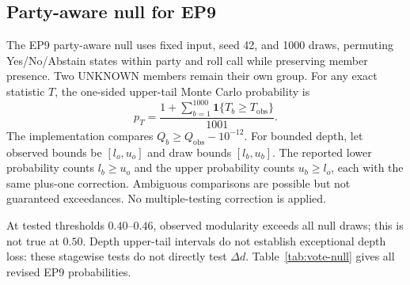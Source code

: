 \documentclass[a4paper,fleqn,oneside]{cas-sc}
\theoremstyle{definition}
\theoremstyle{plain}
\begin{document}
\subsection{Party-aware null for EP9}\label{subsec:party-null}
The EP9 party-aware null uses fixed input, seed 42, and 1000 draws, permuting Yes/No/Abstain states within party and roll call while preserving member presence. Two UNKNOWN members remain their own group. For any exact statistic $T$, the one-sided upper-tail Monte Carlo probability is
\begin{equation}
p_T=\frac{1+\sum_{b=1}^{1000}\mathbf1\{T_b\geq T_{\mathrm{obs}}\}}{1001}.
\end{equation}
The implementation compares $Q_b\geq Q_{\mathrm{obs}}-10^{-12}$. For bounded depth, let observed bounds be $[l_o,u_o]$ and draw bounds $[l_b,u_b]$. The reported lower probability counts $l_b\geq u_o$ and the upper probability counts $u_b\geq l_o$, each with the same plus-one correction. Ambiguous comparisons are possible but not guaranteed exceedances. No multiple-testing correction is applied.

At tested thresholds $0.40$--$0.46$, observed modularity exceeds all null draws; this is not true at $0.50$. Depth upper-tail intervals do not establish exceptional depth loss: these stagewise tests do not directly test $\Delta d$. Table~\ref{tab:vote-null} gives all revised EP9 probabilities.
\end{document}
